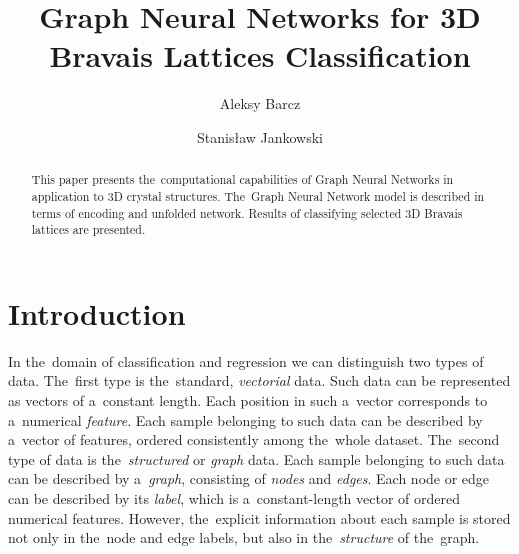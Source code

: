 \documentclass{llncs}
\title{Graph Neural Networks for 3D Bravais Lattices Classification}
\author{Aleksy Barcz \and Stanis{\l}aw Jankowski}
\institute{Warsaw University of Technology, Institute of Electronic Systems, Warsaw, Poland}
\begin{document}
\maketitle
%
\begin{abstract}
This paper presents the~computational capabilities of Graph Neural Networks in application to 3D crystal structures. The~Graph Neural Network model is described in terms of encoding and unfolded network. Results of classifying selected 3D Bravais lattices are presented.
\end{abstract}

\section{Introduction}
In the~domain of classification and regression we can distinguish two types of data. The~first type is the~standard, \emph{vectorial} data. Such data can be represented as vectors of a~constant length. Each position in such a~vector corresponds to a~numerical \emph{feature}. Each sample belonging to such data can be described by a~vector of features, ordered consistently among the~whole dataset. The~second type of data is the~\emph{structured} or \emph{graph} data. Each sample belonging to such data can be described by a~\emph{graph}, consisting of \emph{nodes} and \emph{edges}. Each node or edge can be described by its \emph{label}, which is a~constant-length vector of ordered numerical features. However, the~explicit information about each sample is stored not only in the~node and edge labels, but also in the~\emph{structure} of the~graph.
\end{document}
